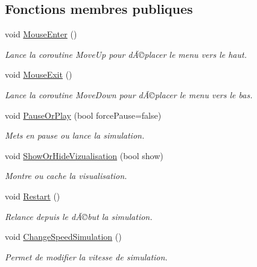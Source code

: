 \subsection*{Fonctions membres publiques}
\begin{DoxyCompactItemize}
\item 
void \mbox{\hyperlink{class_menu_visualization_u_i_ade48d2d4dd652f9f693072bf3d6a5c1c}{Mouse\+Enter}} ()
\begin{DoxyCompactList}\small\item\em Lance la coroutine Move\+Up pour dÃ©placer le menu vers le haut. \end{DoxyCompactList}\item 
void \mbox{\hyperlink{class_menu_visualization_u_i_a47ce6ce3497846e9048582985fc3d8be}{Mouse\+Exit}} ()
\begin{DoxyCompactList}\small\item\em Lance la coroutine Move\+Down pour dÃ©placer le menu vers le bas. \end{DoxyCompactList}\item 
void \mbox{\hyperlink{class_menu_visualization_u_i_a9affc75173b7b9e70340b2b934398464}{Pause\+Or\+Play}} (bool force\+Pause=false)
\begin{DoxyCompactList}\small\item\em Mets en pause ou lance la simulation. \end{DoxyCompactList}\item 
void \mbox{\hyperlink{class_menu_visualization_u_i_ab06398a58bc8438ead7172d9e09b8bca}{Show\+Or\+Hide\+Vizualisation}} (bool show)
\begin{DoxyCompactList}\small\item\em Montre ou cache la visualisation. \end{DoxyCompactList}\item 
void \mbox{\hyperlink{class_menu_visualization_u_i_ad71bfeae87aee9f53387e7abf59040c4}{Restart}} ()
\begin{DoxyCompactList}\small\item\em Relance depuis le dÃ©but la simulation. \end{DoxyCompactList}\item 
void \mbox{\hyperlink{class_menu_visualization_u_i_abae4f4813543053bd5fc9d68ed4916d5}{Change\+Speed\+Simulation}} ()
\begin{DoxyCompactList}\small\item\em Permet de modifier la vitesse de simulation. \end{DoxyCompactList}\item 

\end{DoxyCompactItemize}
